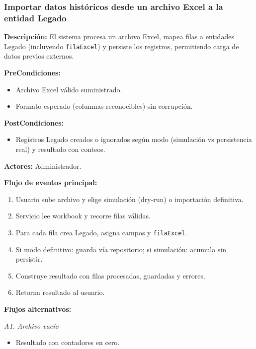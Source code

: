 \subsubsection{Importar datos históricos desde un archivo Excel a la entidad Legado}

\textbf{Descripción:} El sistema procesa un archivo Excel, mapea filas a entidades Legado (incluyendo \texttt{filaExcel}) y persiste los registros, permitiendo carga de datos previos externos.

\vspace{0.5em}
\noindent\textbf{PreCondiciones:}
\begin{itemize}[nosep]
   \item Archivo Excel válido suministrado.
   \item Formato esperado (columnas reconocibles) sin corrupción.
\end{itemize}

\vspace{0.5em}
\noindent\textbf{PostCondiciones:}
\begin{itemize}[nosep]
   \item Registros Legado creados o ignorados según modo (simulación vs persistencia real) y resultado con conteos.
\end{itemize}

\vspace{0.5em}
\noindent\textbf{Actores:} Administrador.

\vspace{0.5em}
\noindent\textbf{Flujo de eventos principal:}
\begin{enumerate}[nosep]
   \item Usuario sube archivo y elige simulación (dry-run) o importación definitiva.
   \item Servicio lee workbook y recorre filas válidas.
   \item Para cada fila crea Legado, asigna campos y \texttt{filaExcel}.
   \item Si modo definitivo: guarda vía repositorio; si simulación: acumula sin persistir.
   \item Construye resultado con filas procesadas, guardadas y errores.
   \item Retorna resultado al usuario.
\end{enumerate}

\vspace{0.5em}
\noindent\textbf{Flujos alternativos:}

\vspace{0.3em}
\noindent\textit{A1. Archivo vacío}
\begin{itemize}[nosep]
   \item Resultado con contadores en cero.
\end{itemize}

